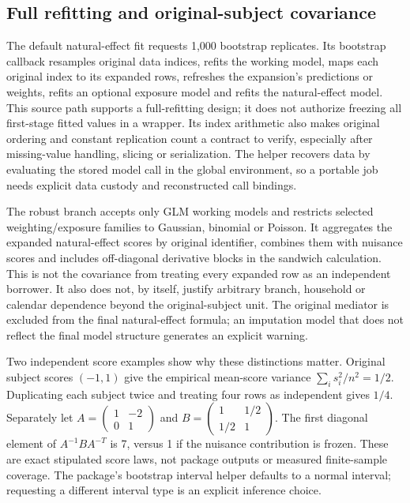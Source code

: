 \subsection{Full refitting and original-subject covariance}
\label{exec23:medflex-uncertainty}
The default natural-effect fit requests 1,000 bootstrap replicates. Its
bootstrap callback resamples original data indices, refits the working model,
maps each original index to its expanded rows, refreshes the expansion's
predictions or weights, refits an optional exposure model and refits the
natural-effect model. This source path supports a full-refitting design;
it does not authorize freezing all first-stage fitted values in a wrapper.
Its index arithmetic also makes original ordering and constant replication
count a contract to verify, especially after missing-value handling, slicing
or serialization. The helper recovers data by evaluating the stored model
call in the global environment, so a portable job needs explicit data custody
and reconstructed call bindings.
\citep{exec23_medflex_sources}

The robust branch accepts only GLM working models and restricts selected
weighting/exposure families to Gaussian, binomial or Poisson. It aggregates
the expanded natural-effect scores by original identifier, combines them
with nuisance scores and includes off-diagonal derivative blocks in the
sandwich calculation. This is not the covariance from treating every expanded
row as an independent borrower. It also does not, by itself, justify arbitrary
branch, household or calendar dependence beyond the original-subject unit.
The original mediator is excluded from the final natural-effect formula;
an imputation model that does not reflect the final model structure generates
an explicit warning.
\citep{exec23_medflex_sources}

Two independent score examples show why these distinctions matter. Original
subject scores $(-1,1)$ give the empirical mean-score variance
$\sum_i s_i^2/n^2=1/2$. Duplicating each subject twice and treating four
rows as independent gives $1/4$. Separately let
$A=\left(\begin{smallmatrix}1&-2\\0&1\end{smallmatrix}\right)$
and $B=\left(\begin{smallmatrix}1&1/2\\1/2&1\end{smallmatrix}\right)$.
The first diagonal element of $A^{-1}BA^{-T}$ is 7, versus 1 if
the nuisance contribution is frozen. These are exact stipulated score laws,
not package outputs or measured finite-sample coverage. The package's
bootstrap interval helper defaults to a normal interval; requesting a
different interval type is an explicit inference choice.
\citep{exec23_medflex_sources,exec23_medflex_reference}

